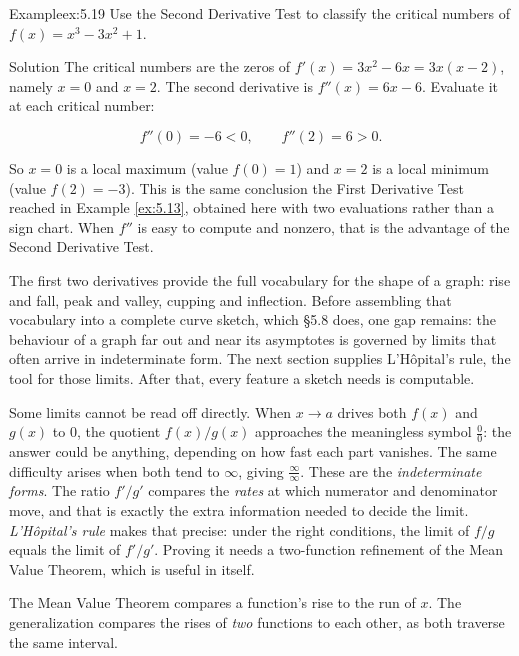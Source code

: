 \documentclass[a4paper,12pt,oneside]{memoir}
\begin{document}
\begin{workedexample}
\begin{envexample}{Example}{ex:5.19}{}
Use the Second Derivative Test to classify the critical numbers of \(f(x) = x^{3} - 3x^{2} + 1\).
\end{envexample}
\begin{envsolution}{Solution}{}{}
The critical numbers are the zeros of \(f'(x) = 3x^{2} - 6x = 3x(x - 2)\), namely \(x = 0\) and \(x = 2\). The second derivative is \(f''(x) = 6x - 6\). Evaluate it at each critical number:

\[ f''(0) = -6 < 0, \qquad f''(2) = 6 > 0. \]

So \(x = 0\) is a local maximum (value \(f(0) = 1\)) and \(x = 2\) is a local minimum (value \(f(2) = -3\)). This is the same conclusion the First Derivative Test reached in Example \ref{ex:5.13}, obtained here with two evaluations rather than a sign chart. When \(f''\) is easy to compute and nonzero, that is the advantage of the Second Derivative Test. \qedmark
\end{envsolution}
\end{workedexample}
The first two derivatives provide the full vocabulary for the shape of a graph: rise and fall, peak and valley, cupping and inflection. Before assembling that vocabulary into a complete curve sketch, which §5.8 does, one gap remains: the behaviour of a graph far out and near its asymptotes is governed by limits that often arrive in indeterminate form. The next section supplies L’Hôpital’s rule, the tool for those limits. After that, every feature a sketch needs is computable.


Some limits cannot be read off directly. When \(x \to a\) drives both \(f(x)\) and \(g(x)\) to \(0\), the quotient \(f(x)/g(x)\) approaches the meaningless symbol \(\tfrac{0}{0}\): the answer could be anything, depending on how fast each part vanishes. The same difficulty arises when both tend to \(\infty\), giving \(\tfrac{\infty}{\infty}\). These are the \emph{indeterminate forms}. The ratio \(f'\!/g'\) compares the \emph{rates} at which numerator and denominator move, and that is exactly the extra information needed to decide the limit. \emph{L’Hôpital’s rule} makes that precise: under the right conditions, the limit of \(f/g\) equals the limit of \(f'\!/g'\). Proving it needs a two-function refinement of the Mean Value Theorem, which is useful in itself.

The Mean Value Theorem compares a function’s rise to the run of \(x\). The generalization compares the rises of \emph{two} functions to each other, as both traverse the same interval.
\end{document}
